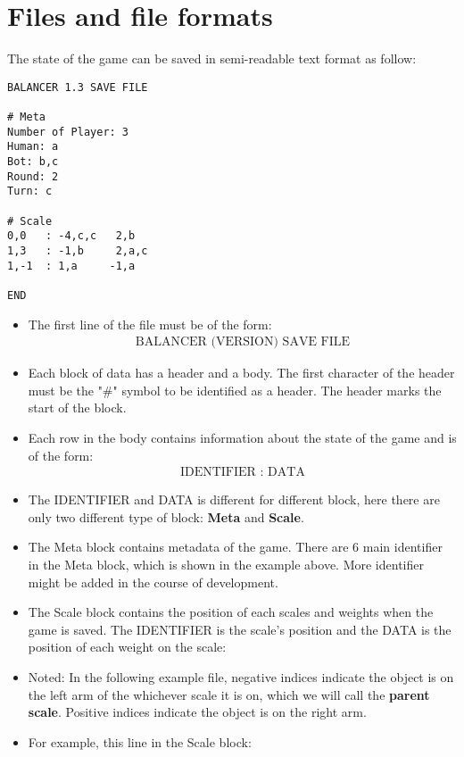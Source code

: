 \documentclass[12pt]{article}
\begin{document}
\section{Files and file formats}
The state of the game can be saved in semi-readable text format as follow:
\begin{verbatim}
BALANCER 1.3 SAVE FILE

# Meta
Number of Player: 3
Human: a
Bot: b,c
Round: 2
Turn: c

# Scale
0,0   : -4,c,c   2,b
1,3   : -1,b     2,a,c
1,-1  : 1,a     -1,a

END

\end{verbatim}

\begin{itemize}
  \item The first line of the file must be of the form: 
    \begin{align*}
      \text{BALANCER (VERSION) SAVE FILE}
    \end{align*}
  \item Each block of data has a header and a body. The first character of the
    header must be the "\#" symbol to be identified as a header. The header
    marks the start of the block.
  \item Each row in the body contains information about the state of the game
    and is of the form:
    \begin{align*}
      \text{IDENTIFIER : DATA}
    \end{align*}
    \item The IDENTIFIER and DATA is different for different block, here there
      are only two different type of block: \textbf{Meta} and \textbf{Scale}.
  \item The Meta block contains metadata of the game. There are 6 main
    identifier in the Meta block, which is shown in the example above. More
    identifier might be added in the course of development. 
  \item The Scale block contains the position of each scales and weights when
    the game is saved. The IDENTIFIER is the scale's position and the DATA is
    the position of each weight on the scale:
  \item Noted: In the following example file, negative indices indicate the
    object is on the left arm of the whichever scale it is on, which we will
    call the \textbf{parent scale}.  Positive indices indicate the object is on
    the right arm.
  \item For example, this line in the Scale block:

\end{itemize}
\end{document}
